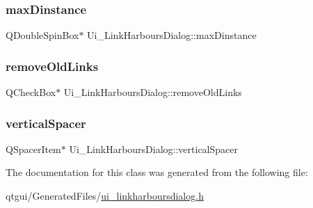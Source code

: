 \subsubsection{\texorpdfstring{maxDinstance}{maxDinstance}}
{\footnotesize\ttfamily Q\+Double\+Spin\+Box$\ast$ Ui\+\_\+\+Link\+Harbours\+Dialog\+::max\+Dinstance}

\mbox{\label{class_ui___link_harbours_dialog_a5085a975deb863aba81d34fee5b6fa98}} 
\subsubsection{\texorpdfstring{removeOldLinks}{removeOldLinks}}
{\footnotesize\ttfamily Q\+Check\+Box$\ast$ Ui\+\_\+\+Link\+Harbours\+Dialog\+::remove\+Old\+Links}

\mbox{\label{class_ui___link_harbours_dialog_a06e201f60c0f1afdcbf84da1ec5a5eb7}} 
\subsubsection{\texorpdfstring{verticalSpacer}{verticalSpacer}}
{\footnotesize\ttfamily Q\+Spacer\+Item$\ast$ Ui\+\_\+\+Link\+Harbours\+Dialog\+::vertical\+Spacer}



The documentation for this class was generated from the following file\+:\begin{DoxyCompactItemize}
\item 
qtgui/\+Generated\+Files/\mbox{\hyperlink{ui__linkharboursdialog_8h}{ui\+\_\+linkharboursdialog.\+h}}\end{DoxyCompactItemize}
